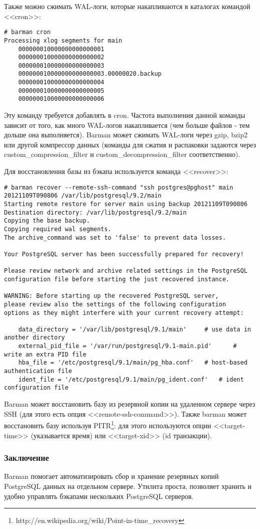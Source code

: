 Также можно сжимать WAL-логи, которые накапливаются в каталогах командой <<cron>>:

\begin{lstlisting}[label=lst:barman16,caption=Архивирование WAL-логов]
# barman cron
Processing xlog segments for main
	000000010000000000000001
	000000010000000000000002
	000000010000000000000003
	000000010000000000000003.00000020.backup
	000000010000000000000004
	000000010000000000000005
	000000010000000000000006
\end{lstlisting}

Эту команду требуется добавлять в cron. Частота выполнения данной команды зависит от того, как много WAL-логов накапливается (чем больше файлов - тем дольше она выполняется). Barman может сжимать WAL-логи через gzip, bzip2 или другой компрессор данных (команды для сжатия и распаковки задаются через custom\_compression\_filter и custom\_decompression\_filter соответственно).

Для восстановления базы из бэкапа используется команда <<recover>>:

\begin{lstlisting}[label=lst:barman17,caption=Восстановление базы]
# barman recover --remote-ssh-command "ssh postgres@pghost" main 20121109T090806 /var/lib/postgresql/9.2/main
Starting remote restore for server main using backup 20121109T090806
Destination directory: /var/lib/postgresql/9.2/main
Copying the base backup.
Copying required wal segments.
The archive_command was set to 'false' to prevent data losses.

Your PostgreSQL server has been successfully prepared for recovery!

Please review network and archive related settings in the PostgreSQL
configuration file before starting the just recovered instance.

WARNING: Before starting up the recovered PostgreSQL server,
please review also the settings of the following configuration
options as they might interfere with your current recovery attempt:

    data_directory = '/var/lib/postgresql/9.1/main'		# use data in another directory
    external_pid_file = '/var/run/postgresql/9.1-main.pid'		# write an extra PID file
    hba_file = '/etc/postgresql/9.1/main/pg_hba.conf'	# host-based authentication file
    ident_file = '/etc/postgresql/9.1/main/pg_ident.conf'	# ident configuration file
\end{lstlisting}

Barman может восстановить базу из резервной копии на удаленном сервере через SSH (для этого есть опция <<remote-ssh-command>>). Также barman может восстановить базу используя PITR\footnote{http://en.wikipedia.org/wiki/Point-in-time\_recovery}: для этого используются опции <<target-time>> (указывается время) или <<target-xid>> (id транзакции).

\subsubsection{Заключение}
Barman помогает автоматизировать сбор и хранение резервных копий PostgreSQL данных на отдельном сервере. Утилита проста, позволяет хранить и удобно управлять бэкапами нескольких PostgreSQL серверов.